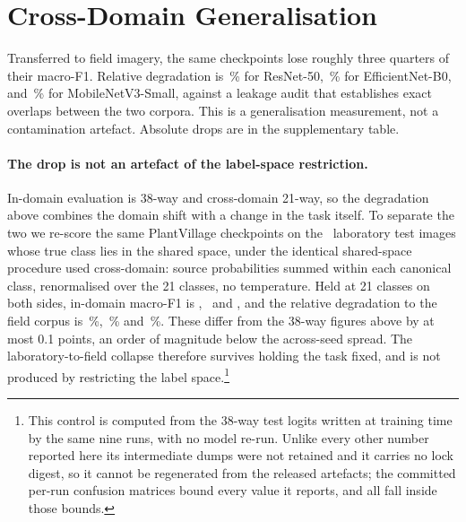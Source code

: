 \documentclass[runningheads]{llncs}
\begin{document}


\section{Cross-Domain Generalisation}
\label{sec:xdomain}

Transferred to field imagery, the same checkpoints lose roughly three quarters
of their macro-F1. Relative degradation is \RelDropFRn{}\,\% for ResNet-50,
\RelDropFEb{}\,\% for EfficientNet-B0, and \RelDropFMn{}\,\% for
MobileNetV3-Small, against a leakage audit that establishes \NLeakExactCore{}
exact overlaps between the two corpora. This is a generalisation measurement,
not a contamination artefact. Absolute drops are in the supplementary table.

\paragraph{The drop is not an artefact of the label-space restriction.}
In-domain evaluation is 38-way and cross-domain 21-way, so the degradation
above combines the domain shift with a change in the task itself. To separate
the two we re-score the same PlantVillage checkpoints on the \NPvTestShared\
laboratory test images whose true class lies in the shared space, under the
identical shared-space procedure used cross-domain: source probabilities summed
within each canonical class, renormalised over the 21 classes, no temperature.
Held at 21 classes on both sides, in-domain macro-F1 is
\MacroFPvInSharedRn, \MacroFPvInSharedEb\ and \MacroFPvInSharedMn, and the
relative degradation to the field corpus is \RelDropFSharedRn\,\%,
\RelDropFSharedEb\,\% and \RelDropFSharedMn\,\%. These differ from the 38-way
figures above by at most 0.1 points, an order of magnitude below the
across-seed spread. The laboratory-to-field
collapse therefore survives holding the task fixed, and is not produced by
restricting the label space.\footnote{This control is computed from the 38-way
test logits written at training time by the same nine runs, with no model
re-run. Unlike every other number reported here its intermediate dumps were not
retained and it carries no lock digest, so it cannot be regenerated from the
released artefacts; the committed per-run confusion matrices bound every value
it reports, and all fall inside those bounds.}
\end{document}
